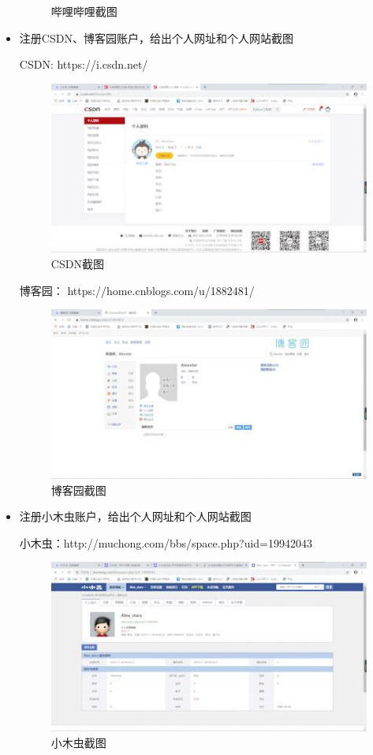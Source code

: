 \documentclass{article}
\begin{document}
\begin{itemize}
\begin{figure}[H]
	\caption{哔哩哔哩截图}\par
\end{figure}
    \item 注册CSDN、博客园账户，给出个人网址和个人网站截图\par 
    CSDN: https://i.csdn.net/\par 
    \begin{figure}[H]
    	\centering
    	\includegraphics[scale=0.6]{CSDN}
    	\caption{CSDN截图}\par
    \end{figure} 
    博客园： https://home.cnblogs.com/u/1882481/ \par 
     \begin{figure}[H]
    	\centering
    	\includegraphics[scale=0.6]{BKY}
    	\caption{博客园截图}\par
    \end{figure} 
    \item 注册小木虫账户，给出个人网址和个人网站截图 \par 
    小木虫：http://muchong.com/bbs/space.php?uid=19942043 \par 
    \begin{figure}[H]
    	\centering
    	\includegraphics[scale=0.6]{XMC}
    	\caption{小木虫截图}\par
    \end{figure} 
\end{itemize}


\hspace*{\fill} \\




\end{document}

